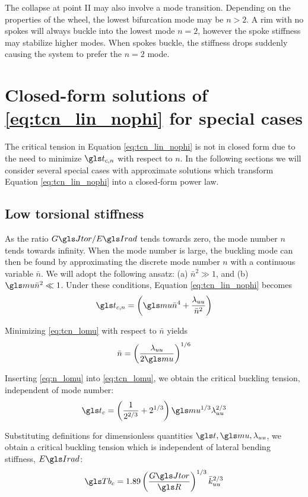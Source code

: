 \documentclass[\rootdir/thesis.tex]{subfiles}
\begin{document}
The collapse at point II may also involve a mode transition. Depending on the properties of the wheel, the lowest bifurcation mode may be $n>2$. A rim with no spokes will always buckle into the lowest mode $n=2$, however the spoke stiffness may stabilize higher modes. When spokes buckle, the stiffness drops suddenly causing the system to prefer the $n=2$ mode.


\section{Closed-form solutions of \eqref{eq:tcn_lin_nophi} for special cases}

The critical tension in Equation \ref{eq:tcn_lin_nophi} is not in closed form due to the need to minimize $\ts_{c,n}$ with respect to $n$. In the following sections we will consider several special cases with approximate solutions which transform Equation \eqref{eq:tcn_lin_nophi} into a closed-form power law.

\subsection{Low torsional stiffness}
As the ratio $\GJ/\EIr$ tends towards zero, the mode number $n$ tends towards infinity. When the mode number is large, the buckling mode can then be found by approximating the discrete mode number $n$ with a continuous variable $\bar{n}$. We will adopt the following ansatz: (a) $\bar{n}^2 \gg 1$, and (b) $\m\bar{n}^2 \ll 1$. Under these conditions, Equation \eqref{eq:tcn_lin_nophi} becomes
\begin{equation}
\label{eq:tcn_lomu}
\ts_{c,n} = \left(\m \bar{n}^4 + \frac{\lr_{uu}}{\bar{n}^2}\right)
\end{equation}

Minimizing \eqref{eq:tcn_lomu} with respect to $\bar{n}$ yields
\begin{equation}
\label{eq:n_lomu}
\bar{n}=\left(\frac{\lr_{uu}}{2\m}\right)^{1/6}
\end{equation}

Inserting \eqref{eq:n_lomu} into \eqref{eq:tcn_lomu}, we obtain the critical buckling tension, independent of mode number:
\begin{equation}
\label{eq:tc_lomu}
\ts_c = \left(\frac{1}{2^{2/3}} + 2^{1/3}\right)\m^{1/3}\lr_{uu}^{2/3}
\end{equation}

Substituting definitions for dimensionless quantities $\ts,\m,\lr_{uu}$, we obtain a critical buckling tension which is independent of lateral bending stiffness, $\EIr$:
\begin{equation}
\label{eq:Tc_lo_mu}
\Tb_c = 1.89 \left( \frac{\GJ}{\R} \right)^{1/3} \kuu^{2/3}
\end{equation}
\end{document}
